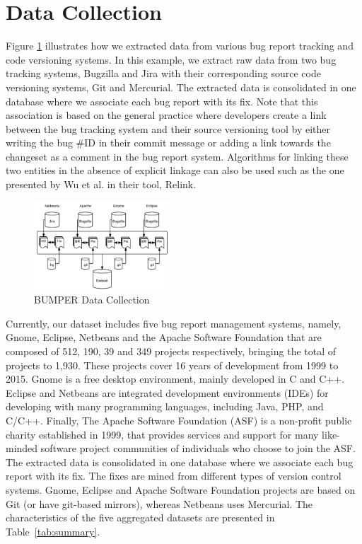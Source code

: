 \documentclass{sig-alternate-05-2015}
\begin{document}
\section{Data Collection}
\label{sec:Data Collection}

Figure \ref{fig:bumper-dc} illustrates how we extracted
data from various bug report tracking and code
versioning systems. In this example, we extract raw data
from two bug tracking systems, Bugzilla and Jira with their
corresponding source code versioning systems, Git and
Mercurial. The extracted data is consolidated in one
database where we associate
each bug report with its fix. Note that this association is
based on the general practice where developers create a link
between the bug tracking system and their source versioning
tool by either writing the bug \#ID in their commit message or
adding a link towards the changeset as a comment in the bug
report system. Algorithms for linking these two entities in
the absence of explicit linkage can also be used such as the
one presented by Wu et al. \cite{Wu2011} in their tool, Relink.


\begin{figure}
  \centering
  \includegraphics[width=0.45\textwidth]{media/dc.png}
  \caption{BUMPER Data Collection\label{fig:bumper-dc}}
\end{figure}


Currently, our dataset includes five bug report management systems, namely, Gnome, Eclipse, Netbeans and the Apache Software Foundation that are composed
of 512, 190, 39 and 349 projects respectively,
bringing the total of projects to 1,930.
These projects cover 16 years of development from 1999 to 2015.
Gnome is a free desktop environment, mainly developed in C and C++.
Eclipse and Netbeans are integrated development environments (IDEs) for
developing with many programming languages, including Java, PHP, and C/C++.
Finally, The Apache Software Foundation (ASF) is a non-profit public charity
established in 1999, that provides services and support for many like-minded
software project communities of individuals who choose to join the ASF.
The extracted data is consolidated in one database where we associate each bug report with its fix.
The fixes are mined from different types of version control systems.
Gnome, Eclipse and Apache Software Foundation projects are based on Git
 (or have git-based mirrors), whereas Netbeans uses Mercurial.
The characteristics of the five aggregated datasets
are presented in Table~\ref{tab:summary}.
\end{document}
